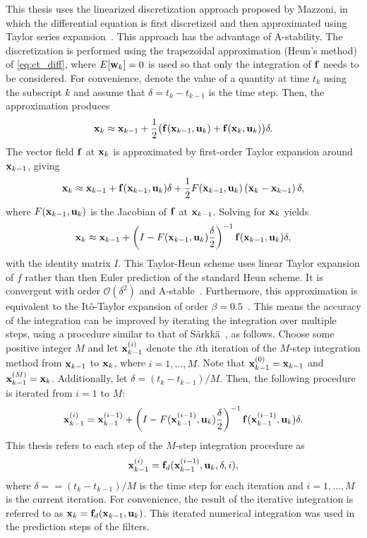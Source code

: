 \documentclass[../zhang_thesis.tex]{subfiles}
\begin{document}
This thesis uses the linearized discretization approach proposed by Mazzoni, in which the differential equation is first discretized and then approximated using Taylor series expansion~\cite{mazzoni07}. This approach has the advantage of A-stability. The discretization is performed using the trapezoidal approximation (Heun's method) of \cref{eq:ct_diff}, where $E[\mathbf{w}_k]=0$ is used so that only the integration of $\mathbf{f}$ needs to be considered. For convenience, denote the value of a
quantity at time $t_k$ using the subscript $k$ and assume that $\delta=t_k-t_{k-1}$ is the time step. Then, the approximation produces
\begin{equation}
    \mathbf{x}_k \approx \mathbf{x}_{k-1} + \frac{1}{2} \big( \mathbf{f}(\mathbf{x}_{k-1},\mathbf{u}_k) + \mathbf{f}(\mathbf{x}_k,\mathbf{u}_k) \big) \delta.
\end{equation}
The vector field $\mathbf{f}$ at $\mathbf{x}_k$ is approximated by first-order Taylor expansion around $\mathbf{x}_{k-1}$, giving
\begin{equation}
    \mathbf{x}_k \approx \mathbf{x}_{k-1} + \mathbf{f}(\mathbf{x}_{k-1},\mathbf{u}_k)\delta + \frac{1}{2} F(\mathbf{x}_{k-1},\mathbf{u}_k) \left( \mathbf{x}_k - \mathbf{x}_{k-1} \right) \delta,
\end{equation}
where $F(\mathbf{x}_{k-1},\mathbf{u}_k)$ is the Jacobian of $\mathbf{f}$ at $\mathbf{x}_{k-1}$. Solving for $\mathbf{x}_k$ yields
\begin{equation}
    \mathbf{x}_k \approx \mathbf{x}_{k-1} + \left( I - F(\mathbf{x}_{k-1},\mathbf{u}_k) \frac{\delta}{2} \right)^{-1} \mathbf{f}(\mathbf{x}_{k-1},\mathbf{u}_k) \delta,
\end{equation}
with the identity matrix $I$. This Taylor-Heun scheme uses linear Taylor expansion of $f$ rather than then Euler prediction of the standard Heun scheme. It is convergent with order $\mathcal{O}(\delta^2)$ and A-stable~\cite{mazzoni07}. Furthermore, this approximation is equivalent to the It\^o-Taylor expansion of order $\beta=0.5$~\cite{kloeden99}. This means the accuracy of the integration can be improved by iterating the integration over multiple steps, using a procedure similar to that of
S\"arkk\"a~\cite{sarkka12}, as follows. Choose some positive integer $M$ and let $\mathbf{x}^{(i)}_{k-1}$ denote the $i$th iteration of the $M$-step integration method from $\mathbf{x}_{k-1}$ to $\mathbf{x}_k$, where $i=1,\dots,M$. Note that $\mathbf{x}^{(0)}_{k-1}=\mathbf{x}_{k-1}$ and $\mathbf{x}^{(M)}_{k-1}=\mathbf{x}_k$. Additionally, let $\delta=(t_k-t_{k-1})/M$. Then, the following procedure is iterated from $i=1$ to $M$:
\begin{equation}
    \mathbf{x}^{(i)}_{k-1} = \mathbf{x}^{(i-1)}_{k-1} + \left( I - F(\mathbf{x}^{(i-1)}_{k-1},\mathbf{u}_k) \frac{\delta}{2} \right)^{-1} \mathbf{f}(\mathbf{x}^{(i-1)}_{k-1},\mathbf{u}_k) \delta.
\end{equation}
This thesis refers to each step of the $M$-step integration procedure as
\begin{equation}
    \mathbf{x}_{k-1}^{(i)} = \mathbf{f}_d(\mathbf{x}_{k-1}^{(i-1)},\mathbf{u}_k,\delta,i),
    \label{eq:mstep_int}
\end{equation}
where $\delta==(t_k-t_{k-1})/M$ is the time step for each iteration and $i=1,\dots,M$ is the current iteration. For convenience, the result of the iterative integration is referred to as $\mathbf{x}_k=\mathbf{f}_d(\mathbf{x}_{k-1},\mathbf{u}_k)$. This iterated numerical integration was used in the prediction steps of the filters.
\end{document}
